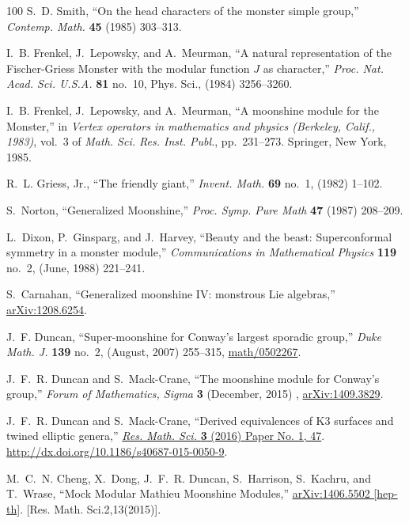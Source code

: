 \documentclass[11pt,a4paper,fontset=windows]{ctexart}
\numberwithin{equation}{section}
\begin{document}
\begin{thebibliography}{100}
S.~D. Smith, ``On the head characters of the monster simple group,'' {\em
  Contemp. Math.} {\bfseries 45} (1985) 303--313.

I.~B. Frenkel, J.~Lepowsky, and A.~Meurman, ``A natural representation of the
  {F}ischer-{G}riess {M}onster with the modular function {$J$} as character,''
  {\em Proc. Nat. Acad. Sci. U.S.A.} {\bfseries 81} no.~10, Phys. Sci., (1984)
  3256--3260.

I.~B. Frenkel, J.~Lepowsky, and A.~Meurman, ``A moonshine module for the
  {M}onster,'' in {\em Vertex operators in mathematics and physics (Berkeley,
  Calif., 1983)}, vol.~3 of {\em Math. Sci. Res. Inst. Publ.}, pp.~231--273.
\newblock Springer, New York, 1985.

R.~L. Griess, Jr., ``The friendly giant,'' {\em Invent. Math.} {\bfseries 69}
  no.~1, (1982) 1--102.

S.~Norton, ``{Generalized Moonshine},'' {\em Proc. Symp. Pure Math} {\bfseries
  47} (1987) 208--209.

L.~Dixon, P.~Ginsparg, and J.~Harvey, ``Beauty and the beast: Superconformal
  symmetry in a monster module,'' {\em Communications in Mathematical Physics}
  {\bfseries 119} no.~2, (June, 1988) 221--241.

S.~Carnahan, ``{Generalized moonshine IV: monstrous Lie algebras},''
  \href{http://arxiv.org/abs/arXiv:1208.6254}{{\ttfamily arXiv:1208.6254}}.

J.~F. Duncan, ``{Super-moonshine for Conway's largest sporadic group},'' {\em
  Duke Math. J.} {\bfseries 139} no.~2, (August, 2007) 255--315,
  \href{http://arxiv.org/abs/math/0502267}{{\ttfamily math/0502267}}.

J.~F.~R. Duncan and S.~Mack-Crane, ``{The moonshine module for Conway's
  group},'' {\em Forum of Mathematics, Sigma} {\bfseries 3} (December, 2015) ,
  \href{http://arxiv.org/abs/arXiv:1409.3829}{{\ttfamily arXiv:1409.3829}}.

J.~F.~R. Duncan and S.~Mack-Crane, ``Derived equivalences of {K}3 surfaces and
  twined elliptic genera,''
  \href{http://dx.doi.org/10.1186/s40687-015-0050-9}{{\em Res. Math. Sci.}
  {\bfseries 3} (2016) Paper No. 1, 47}.
  \url{http://dx.doi.org/10.1186/s40687-015-0050-9}.

M.~C.~N. Cheng, X.~Dong, J.~F.~R. Duncan, S.~Harrison, S.~Kachru, and T.~Wrase,
  ``{Mock Modular Mathieu Moonshine Modules},''
  \href{http://arxiv.org/abs/1406.5502}{{\ttfamily arXiv:1406.5502 [hep-th]}}.
[Res. Math. Sci.2,13(2015)].


\end{thebibliography}
\end{document}
